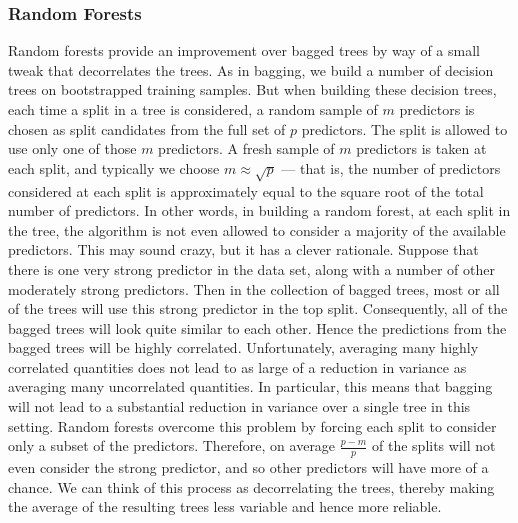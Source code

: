 \subsubsection{Random Forests}
Random forests provide an improvement over bagged trees by way of a small tweak that decorrelates the trees. As in bagging, we build a number of decision trees on bootstrapped training samples. But when building these decision trees, each time a split in a tree is considered, a random sample of $m$ predictors is chosen as split candidates from the full set of $p$ predictors. The split is allowed to use only one of those $m$ predictors. A fresh sample of $m$ predictors is taken at each split, and typically we choose $m \approx \sqrt{p}$ --- that is, the number of predictors considered at each split is approximately equal to the square root of the total number of predictors. In other words, in building a random forest, at each split in the tree, the algorithm is not even allowed to consider a majority of the available predictors. This may sound crazy, but it has a clever rationale. Suppose that there is one very strong predictor in the data set, along with a number of other moderately strong predictors. Then in the collection of bagged trees, most or all of the trees will use this strong predictor in the top split. Consequently, all of the bagged trees will look quite similar to each other. Hence the predictions from the bagged trees will be highly correlated. Unfortunately, averaging many highly correlated quantities does not lead to as large of a reduction in variance as averaging many uncorrelated quantities. In particular, this means that bagging will not lead to a substantial reduction in variance over a single tree in this setting. Random forests overcome this problem by forcing each split to consider only a subset of the predictors. Therefore, on average $\frac{p-m}{p}$ of the splits will not even consider the strong predictor, and so other predictors will have more of a chance. We can think of this process as decorrelating the trees, thereby making the average of the resulting trees less variable and hence more reliable.

